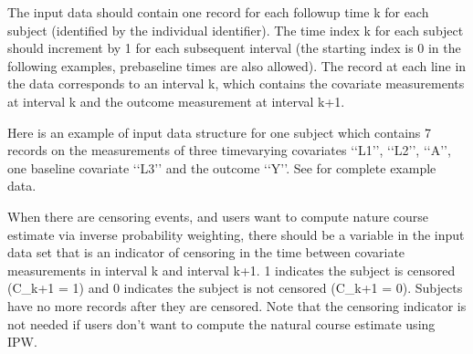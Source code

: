 \documentclass[letterpaper,10pt,english]{sphinxmanual}
\begin{document}
\sphinxAtStartPar
The input data should contain one record for each follow\sphinxhyphen{}up time k for each subject (identified by the individual identifier).
The time index k for each subject should increment by 1 for each subsequent interval (the starting index is 0 in the following
examples, pre\sphinxhyphen{}baseline times are also allowed).
The record at each line in the data corresponds to an interval k, which contains the
covariate measurements at interval k and the outcome measurement at interval k+1.

\sphinxAtStartPar
Here is an example of input data structure for one subject which contains 7 records on
the measurements of three time\sphinxhyphen{}varying covariates ‘‘L1’’, ‘‘L2’’, ‘‘A’’,
one baseline covariate ‘‘L3’’ and the outcome ‘‘Y’’. See  for complete example data.
\begin{quote}

\end{quote}

\sphinxAtStartPar
{} When there are censoring events, and users want to compute nature course estimate via
inverse probability weighting, there should be a variable in the input data set that is an
indicator of censoring in the time between covariate measurements in interval k and interval k+1.
1 indicates the subject is censored (C\_k+1 = 1) and 0 indicates the subject is not censored (C\_k+1 = 0).
Subjects have no more records after they are censored. Note that the censoring indicator is not needed
if users don’t want to compute the natural course estimate using IPW.
\end{document}
